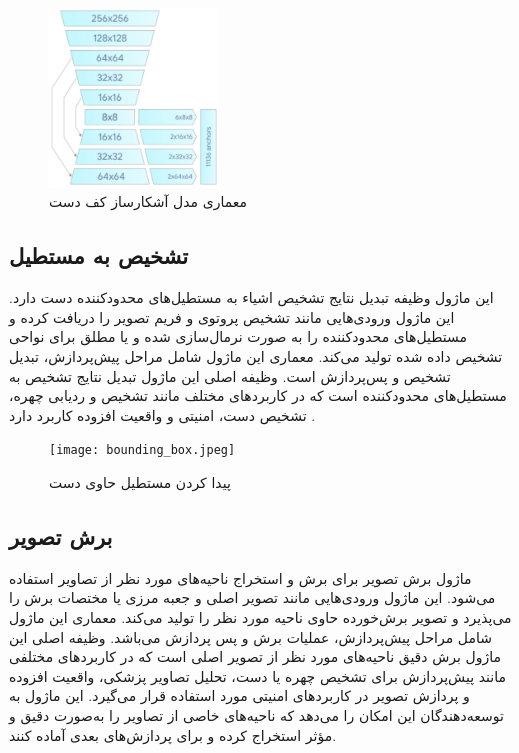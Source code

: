 \begin{figure}[h]
    \centering
    \includegraphics[width=0.4\textwidth]{hand_detector.png}
    \caption{معماری مدل آشکارساز کف دست}
\end{figure}


\subsection{تشخیص به مستطیل \protect{}}
این ماژول وظیفه تبدیل نتایج تشخیص اشیاء به مستطیل‌های محدودکننده دست دارد. این ماژول ورودی‌هایی مانند تشخیص پروتوی  و فریم تصویر  را دریافت کرده و مستطیل‌های محدودکننده را به صورت 
نرمال‌سازی شده و یا مطلق برای نواحی تشخیص داده شده تولید می‌کند. معماری این ماژول شامل مراحل  پیش‌پردازش، تبدیل تشخیص   و پس‌پردازش است. وظیفه اصلی این ماژول تبدیل نتایج تشخیص به 
مستطیل‌های محدودکننده است که در کاربردهای مختلف مانند تشخیص و ردیابی چهره، تشخیص دست، امنیتی و واقعیت افزوده کاربرد دارد .
\cite{zhang2020mediapipe}

\begin{figure}[h]
    \centering
    \texttt{[image: bounding\_box.jpeg]}
    \caption{پیدا کردن مستطیل حاوی دست}
\end{figure}

\subsection{برش تصویر \protect{}}
ماژول برش تصویر برای برش و استخراج ناحیه‌های مورد نظر از تصاویر استفاده می‌شود. این ماژول ورودی‌هایی مانند تصویر اصلی و جعبه مرزی  یا مختصات برش را می‌پذیرد و تصویر برش‌خورده حاوی ناحیه مورد 
نظر را تولید می‌کند. معماری این ماژول شامل مراحل پیش‌پردازش، عملیات برش  و پس‌ پردازش  می‌باشد. وظیفه اصلی این ماژول برش دقیق ناحیه‌های مورد نظر از تصویر اصلی است که در کاربردهای 
مختلفی مانند پیش‌پردازش برای تشخیص چهره یا دست، تحلیل تصاویر پزشکی، واقعیت افزوده و پردازش تصویر در کاربردهای امنیتی مورد استفاده قرار می‌گیرد. این ماژول به 
توسعه‌دهندگان این امکان را می‌دهد که ناحیه‌های خاصی از تصاویر را به‌صورت دقیق و مؤثر استخراج کرده و برای پردازش‌های بعدی آماده کنند.
\cite{zhang2020mediapipe}

